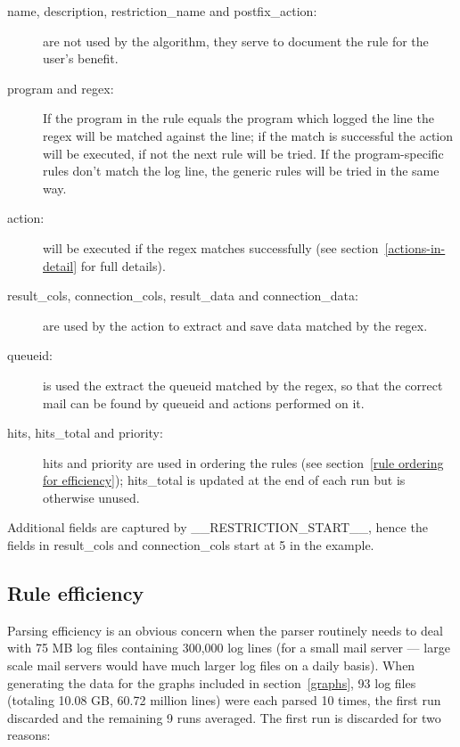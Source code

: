 \documentclass[a4paper,12pt,draft]{article}
\begin{document}
\begin{description}

    \item [name, description, restriction\_name and postfix\_action:] are
        not \newline used by the algorithm, they serve to document the rule
        for the user's benefit.

    \item [program and regex:] If the program in the rule equals the
        program which logged the line the regex will be matched against the
        line; if the match is successful the action will be executed, if not
        the next rule will be tried.  If the program-specific rules don't
        match the log line, the generic rules will be tried in the same
        way.

    \item [action:] will be executed if the regex matches successfully (see
        section~\ref{actions-in-detail} for full details).

    \item [result\_cols, connection\_cols, result\_data and
        connection\_data:] are \newline used by the action to extract and
        save data matched by the regex.

    \item [queueid:] is used the extract the queueid matched by the regex,
        so that the correct mail can be found by queueid and actions
        performed on it.

    \item [hits, hits\_total and priority:] hits and priority are used in
        ordering the rules (see section~\ref{rule ordering for
        efficiency}); hits\_total is updated at the end of each run but is
        otherwise unused.

\end{description}

Additional fields are captured by \_\_RESTRICTION\_START\_\_, hence the
fields in result\_cols and connection\_cols start at 5 in the example.

        
\subsection{Rule efficiency}

\label{rule efficiency}

Parsing efficiency is an obvious concern when the parser routinely needs to
deal with 75 MB log files containing 300,000 log lines (for a small mail
server --- large scale mail servers would have much larger log files on a
daily basis).  When generating the data for the graphs included in
section~\ref{graphs}, 93 log files (totaling 10.08 GB, 60.72 million lines)
were each parsed 10 times, the first run discarded and the remaining 9 runs
averaged.  The first run is discarded for two reasons:
\end{document}
